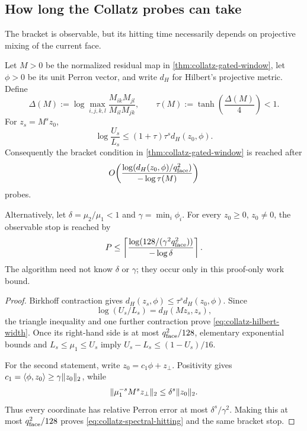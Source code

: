\subsection{How long the Collatz probes can take}

The bracket is observable, but its hitting time necessarily depends on
projective mixing of the current face.

\begin{proposition}
\label{prop:collatz-projective-hitting}
Let $M>0$ be the normalized residual map in
\cref{thm:collatz-gated-window}, let $\phi>0$ be its unit Perron vector, and
write $d_H$ for Hilbert's projective metric.  Define
\begin{equation*}
 \Delta(M):=\log\max_{i,j,k,l}
 \frac{M_{ik}M_{jl}}{M_{il}M_{jk}},
 \qquad
 \tau(M):=\tanh\!\left(\frac{\Delta(M)}4\right)<1.
\end{equation*}
For $z_s=M^sz_0$,
\begin{equation}
 \log\frac{U_s}{L_s}
 \leq(1+\tau)\tau^s d_H(z_0,\phi).
 \label{eq:collatz-hilbert-width}
\end{equation}
Consequently the bracket condition in
\cref{thm:collatz-gated-window} is reached after
\begin{equation}
 O\!\left(
 \frac{\log(d_H(z_0,\phi)/q_{\rm face}^2)}{-\log\tau(M)}
 \right)
 \label{eq:collatz-hilbert-hitting}
\end{equation}
probes.

Alternatively, let $\delta=\mu_2/\mu_1<1$ and
$\gamma=\min_i\phi_i$.  For every $z_0\geq0$, $z_0\neq0$, the observable
stop is reached by
\begin{equation}
 P\leq
 \left\lceil
 \frac{\log(128/(\gamma^2q_{\rm face}^2))}{-\log\delta}
 \right\rceil.
 \label{eq:collatz-spectral-hitting}
\end{equation}
The algorithm need not know $\delta$ or $\gamma$; they occur only in this
proof-only work bound.
\end{proposition}

\begin{proof}
Birkhoff contraction gives
$d_H(z_s,\phi)\leq\tau^sd_H(z_0,\phi)$.  Since
\begin{equation*}
 \log(U_s/L_s)=d_H(Mz_s,z_s),
\end{equation*}
the triangle inequality and one further contraction prove
\cref{eq:collatz-hilbert-width}.  Once its right-hand side is at most
$q_{\rm face}^2/128$, elementary exponential bounds and
$L_s\leq\mu_1\leq U_s$ imply
$U_s-L_s\leq(1-U_s)/16$.

For the second statement, write
$z_0=c_1\phi+z_\perp$.  Positivity gives
$c_1=\langle\phi,z_0\rangle\geq\gamma\lVert z_0\rVert_2$, while
\begin{equation*}
 \lVert\mu_1^{-s}M^sz_\perp\rVert_2
 \leq\delta^s\lVert z_0\rVert_2.
\end{equation*}
Thus every coordinate has relative Perron error at most
$\delta^s/\gamma^2$.  Making this at most
$q_{\rm face}^2/128$ proves \cref{eq:collatz-spectral-hitting} and the same
bracket stop.
\end{proof}

